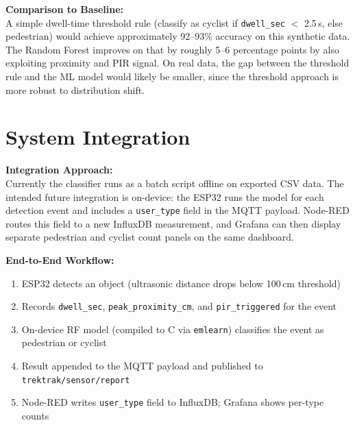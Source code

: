 \documentclass[11pt]{article}
\begin{document}
\noindent\textbf{Comparison to Baseline:}\\{}
A simple dwell-time threshold rule (classify as cyclist if \texttt{dwell\_sec} $<$ 2.5\,s, else pedestrian) would achieve approximately 92--93\% accuracy on this synthetic data. The Random Forest improves on that by roughly 5--6 percentage points by also exploiting proximity and PIR signal. On real data, the gap between the threshold rule and the ML model would likely be smaller, since the threshold approach is more robust to distribution shift.

\section{System Integration}
\label{sec:integration}

\noindent\textbf{Integration Approach:}\\{}
Currently the classifier runs as a batch script offline on exported CSV data. The intended future integration is on-device: the ESP32 runs the model for each detection event and includes a \texttt{user\_type} field in the MQTT payload. Node-RED routes this field to a new InfluxDB measurement, and Grafana can then display separate pedestrian and cyclist count panels on the same dashboard.

\vspace{0.5em}

\noindent\textbf{End-to-End Workflow:}
\begin{enumerate}[noitemsep]
    \item ESP32 detects an object (ultrasonic distance drops below 100\,cm threshold)
    \item Records \texttt{dwell\_sec}, \texttt{peak\_proximity\_cm}, and \texttt{pir\_triggered} for the event
    \item On-device RF model (compiled to C via \texttt{emlearn}) classifies the event as pedestrian or cyclist
    \item Result appended to the MQTT payload and published to \texttt{trektrak/sensor/report}
    \item Node-RED writes \texttt{user\_type} field to InfluxDB; Grafana shows per-type counts
\end{enumerate}

\vspace{0.5em}
\end{document}
